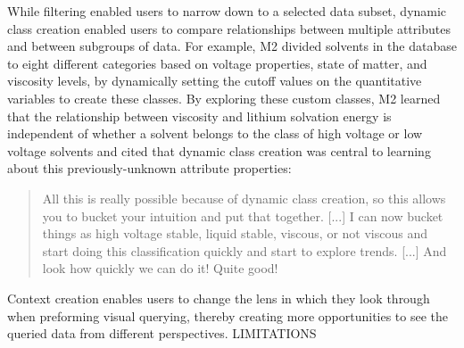 \par While filtering enabled users to narrow down to a selected data subset, dynamic class creation enabled users to compare relationships between multiple attributes and between subgroups of data. For example, M2 divided solvents in the database to eight different categories based on voltage properties, state of matter, and viscosity levels, by dynamically setting the cutoff values on the quantitative variables to create these classes. By exploring these custom classes, M2 learned that the relationship between viscosity and lithium solvation energy is independent of whether a solvent belongs to the class of high voltage or low voltage solvents and cited that dynamic class creation was central to learning about this previously-unknown attribute properties:
\begin{quote}
All this is really possible because of dynamic class creation, so this allows you to bucket your intuition and put that together. [...] I can now bucket things as high voltage stable, liquid stable, viscous, or not viscous and start doing this classification quickly and start to explore trends. [...] And look how quickly we can do it! Quite good!
\end{quote}
Context creation enables users to change the lens in which they look through when preforming visual querying, thereby creating more opportunities to see the queried data from different perspectives.
LIMITATIONS
